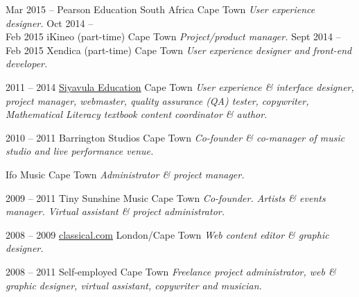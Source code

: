 \documentclass[]{friggeri-cv} %
\begin{document}
\begin{entrylist}
\entry
{Mar 2015 -- }
{Pearson Education South Africa}
{Cape Town}
{\emph{User experience designer.}}
\entry
{Oct 2014 -- \\ Feb 2015}
{iKineo (part-time)}
{Cape Town}
{\emph{Project/product manager.}}
\entry
{Sept 2014 -- \\Feb 2015}
{Xendica (part-time)}
{Cape Town}
{\emph{User experience designer and front-end developer.}}

\entry
{2011 -- 2014}
{\href{http://www.siyavula.com}{\underline{Siyavula Education}}}
{Cape Town}
{\emph{User experience \& interface designer, project manager, webmaster, quality assurance (QA) tester, copywriter, Mathematical Literacy textbook content coordinator \& author.}}

\entry
{2010 -- 2011}
{Barrington Studios}
{Cape Town}
{\emph{Co-founder \& co-manager of music studio and live performance venue.}}



\entry
{}
{Ifo Music}
{Cape Town}
{\emph{Administrator \& project manager.}}

\entry
{2009 -- 2011}
{Tiny Sunshine Music}
{Cape Town}
{\emph{Co-founder. Artists \& events manager. Virtual assistant \& project administrator.}}


\entry
{2008 -- 2009}
{\href{http://www.classical.com}{\underline{classical.com}}}
{London/Cape Town}
{\emph{Web content editor \& graphic designer.}}


\entry
{2008 -- 2011}
{Self-employed}
{Cape Town}
{\emph{Freelance project administrator, web \& graphic designer, virtual assistant, copywriter and musician.}}

\end{entrylist}
\pagebreak
\end{document}
